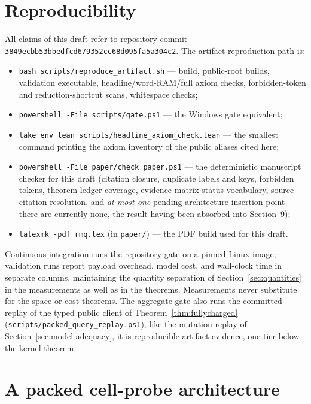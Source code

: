\documentclass[11pt]{article}
\theoremstyle{definition}
\theoremstyle{remark}
\begin{document}
\section{Reproducibility}\label{sec:repro}

All claims of this draft refer to repository commit
\nolinkurl{3849ecbb53bbedfcd679352cc68d095fa5a304c2}. The artifact reproduction
path is:

\begin{itemize}
\item \texttt{bash scripts/reproduce\_artifact.sh} --- build, public-root
  builds, validation executable, headline/word-RAM/full axiom checks,
  forbidden-token and reduction-shortcut scans, whitespace checks;
\item \texttt{powershell -File scripts/gate.ps1} --- the Windows gate
  equivalent;
\item \texttt{lake env lean scripts/headline\_axiom\_check.lean} --- the
  smallest command printing the axiom inventory of the public aliases cited
  here;
\item \texttt{powershell -File paper/check\_paper.ps1} --- the
  deterministic manuscript checker for this draft (citation closure,
  duplicate labels and keys, forbidden tokens, theorem-ledger coverage,
  evidence-matrix status vocabulary, source-citation resolution, and
  \emph{at most one} pending-architecture insertion point --- there are
  currently none, the result having been absorbed into Section~9);
\item \texttt{latexmk -pdf rmq.tex} (in \texttt{paper/}) --- the PDF build
  used for this draft.
\end{itemize}

Continuous integration runs the repository gate on a pinned Linux image;
validation runs report payload overhead, model cost, and wall-clock time in
separate columns, maintaining the quantity separation of
Section~\ref{sec:quantities} in the measurements as well as in the
theorems. Measurements never substitute for the space or cost theorems.
The aggregate gate also runs the committed replay of the typed public client
of Theorem~\ref{thm:fullycharged} (\texttt{scripts/packed\_query\_replay.ps1});
like the mutation replay of Section~\ref{sec:model-adequacy}, it is
reproducible-artifact evidence, one tier below the kernel theorem.

\section{A packed cell-probe architecture}
\label{sec:pending}
\end{document}
